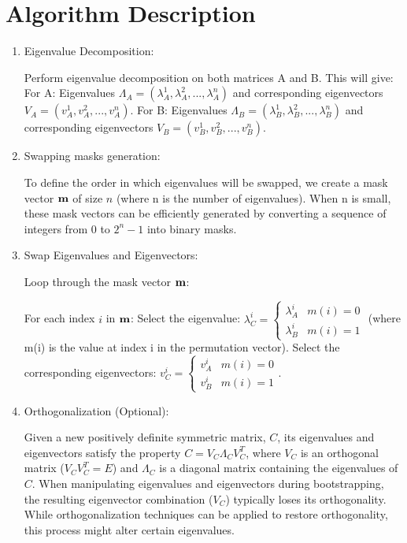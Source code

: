 \documentclass{article}
\begin{document}
\section{Algorithm Description}
\begin{enumerate}
\item Eigenvalue Decomposition:

Perform eigenvalue decomposition on both matrices A and B. This will give:
For A: Eigenvalues $\Lambda_A=(\lambda_{A}^1, \lambda_A^2, ..., \lambda_A^n)$ and corresponding eigenvectors $V_A=(v_A^1, v_A^2, ..., v_A^n)$.
For B: Eigenvalues $\Lambda_B=(\lambda_B^1, \lambda_B^2, ..., \lambda_B^n)$ and corresponding eigenvectors $V_B=(v_B^1, v_B^2, ..., v_B^n)$.
\item Swapping masks generation:

To define the order in which eigenvalues will be swapped, we create a mask vector $\bold m$ of size $n$ (where n is the number of eigenvalues). When n is small, these mask vectors can be efficiently generated by converting a sequence of integers from $0$ to $2^n-1$ into binary masks.

\item Swap Eigenvalues and Eigenvectors:

Loop through the mask vector  $\bold m$:

For each index $i$ in  $\bold m$:
Select the eigenvalue: $\lambda_C^i = \begin{cases} \lambda_A^i & m(i) = 0\\ \lambda_B^{i} & m(i)=1\end{cases}$ (where m(i) is the value at index i in the permutation vector).
Select the corresponding eigenvectors: $v_C^i = \begin{cases} v_A^i & m(i)=0\\ v_B^i & m(i)=1 \end{cases}$.

\item Orthogonalization (Optional):

Given a new positively definite symmetric matrix, $C$, its eigenvalues and eigenvectors satisfy the property $C = V_C \Lambda_C V_C^T$, where $V_C$ is an orthogonal matrix ($V_CV_C^T = E$) and $\Lambda_C$ is a diagonal matrix containing the eigenvalues of $C$. When manipulating eigenvalues and eigenvectors during bootstrapping, the resulting eigenvector combination ($V_C$) typically loses its orthogonality. While orthogonalization techniques can be applied to restore orthogonality, this process might alter certain eigenvalues.


\end{enumerate}
\end{document}
